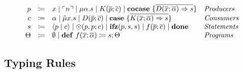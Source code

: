\begin{definition}
    \[
      \begin{array}{rcll}
        p & \coloneqq & x \mid \ulcorner n \urcorner \mid \mu\alpha.s \mid K(\overline{p}; \overline{c}) \mid \mathbf{cocase}\ \{ \overline{D(\overline{x};\overline{\alpha}) \Rightarrow s} \} & \emph{Producers}\\
        c & \coloneqq & \alpha \mid \tilde{\mu}x.s \mid D(\overline{p}; \overline{c}) \mid \mathbf{case}\ \{ \overline{K(\overline{x}; \overline{\alpha}) \Rightarrow s} \}& \emph{Consumers}\\
        s & \coloneqq & \langle p \mid c \rangle \mid \odot(p, p; c) \mid \mathbf{ifz}(p, s, s) \mid f(\overline{p}; \overline{c}) \mid \mathbf{done} & \emph{Statements}\\
        \Theta & \coloneqq & \emptyset \mid \mathbf{def}\ f(\overline{x}; \overline{\alpha}) \coloneq s; \Theta & \emph{Programs}\\
      \end{array}
    \]
  \end{definition}

\subsection{Typing Rules}
\label{subsec:core:typing-rules}

